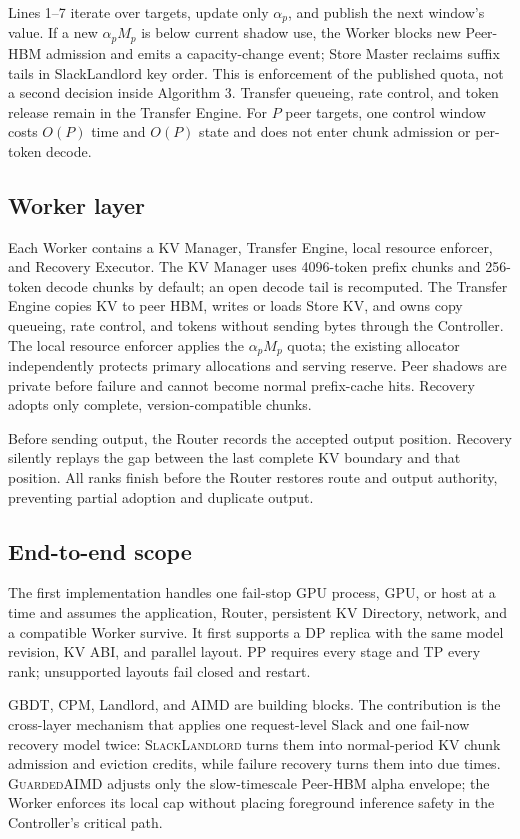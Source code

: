 

Lines 1--7 iterate over targets, update only $\alpha_p$, and publish the next
window's value.  If a new $\alpha_pM_p$ is below current shadow use, the Worker
blocks new Peer-HBM admission and emits a capacity-change event; Store Master
reclaims suffix tails in SlackLandlord key order.  This is enforcement of the
published quota, not a second decision inside Algorithm 3.  Transfer queueing,
rate control, and token release remain in the Transfer Engine.  For $P$ peer
targets, one control window costs $O(P)$ time and $O(P)$ state and does not
enter chunk admission or per-token decode.

\subsection{Worker layer}
\label{sec:worker-layer}

Each Worker contains a KV Manager, Transfer Engine, local resource enforcer,
and Recovery Executor.  The KV Manager uses 4096-token prefix chunks and
256-token decode chunks by default; an open decode tail is recomputed.  The
Transfer Engine copies KV to peer HBM, writes or loads Store KV, and owns copy
queueing, rate control, and tokens without sending bytes through the Controller.
The local resource enforcer applies the $\alpha_pM_p$ quota; the existing
allocator independently protects primary allocations and serving reserve.  Peer shadows are
private before failure and cannot become normal prefix-cache hits.  Recovery
adopts only complete, version-compatible chunks.

Before sending output, the Router records the accepted output position.
Recovery silently replays the gap between the last complete KV boundary and
that position.  All ranks finish before the Router restores route and output
authority, preventing partial adoption and duplicate output.

\subsection{End-to-end scope}
\label{sec:end-to-end}

The first implementation handles one fail-stop GPU process, GPU, or host at a
time and assumes the application, Router, persistent KV Directory, network,
and a compatible Worker survive.  It first supports a DP replica with the same
model revision, KV ABI, and parallel layout.  PP requires every stage and TP
every rank; unsupported layouts fail closed and restart.

GBDT, CPM, Landlord, and AIMD are building blocks.  The contribution is the
cross-layer mechanism that applies one request-level Slack and one fail-now
recovery model twice: \textsc{SlackLandlord} turns them into normal-period KV
chunk admission and eviction credits, while failure recovery turns them into due times.
\textsc{GuardedAIMD} adjusts only the slow-timescale Peer-HBM alpha envelope;
the Worker enforces its local cap without placing foreground inference safety
in the Controller's critical path.
